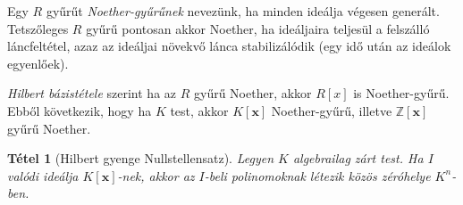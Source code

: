 \documentclass[%
	DIV=15,appendixprefix]{scrreprt}
\newtheorem*{tetel}{Tétel}
\theoremstyle{definition}
\theoremstyle{remark}
\begin{document}
Egy $ R $ gyűrűt
\emph{Noether-gyűrűnek} nevezünk, ha minden ideálja végesen generált. Tetszőleges $ R $ gyűrű
pontosan akkor Noether, ha ideáljaira teljesül a felszálló láncfeltétel, azaz az ideáljai növekvő
lánca stabilizálódik (egy idő után az ideálok egyenlőek).

\emph{Hilbert bázistétele} szerint ha az $ R $ gyűrű Noether, akkor $ R \left[ x \right] $ is
Noether-gyűrű. Ebből következik, hogy ha $ K $ test, akkor $ K \left[ \mathbf{ x } \right] $
Noether-gyűrű, illetve $ \mathbb{ Z } \left[ \mathbf{ x } \right] $ gyűrű Noether.
%
\begin{tetel}[Hilbert gyenge Nullstellensatz]
	Legyen $ K $ algebrailag zárt test. Ha $ I $ valódi ideálja $ K \left[ \mathbf{ x }
	\right] $-nek, akkor az $ I $-beli polinomoknak létezik közös zéróhelye $ K^{ n } $-ben.
\end{tetel}
\end{document}
